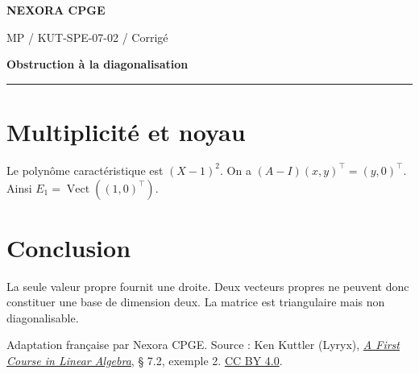 \documentclass[11pt,a4paper]{article}
\begin{document}
{\small\bfseries\color{nexorablue} NEXORA CPGE}\par
{\small MP / KUT-SPE-07-02 / Corrigé}\par
{\LARGE\bfseries Obstruction à la diagonalisation}\par
\vspace{0.25em}\hrule\vspace{0.6em}

\section*{Multiplicité et noyau}
Le polynôme caractéristique est $(X-1)^2$. On a $(A-I)(x,y)^\top=(y,0)^\top$. Ainsi $E_1=\operatorname{Vect}((1,0)^\top)$.

\section*{Conclusion}
La seule valeur propre fournit une droite. Deux vecteurs propres ne peuvent donc constituer une base de dimension deux. La matrice est triangulaire mais non diagonalisable.

\bigskip
{\footnotesize Adaptation française par Nexora CPGE. Source : Ken Kuttler (Lyryx),
\href{https://math.libretexts.org/Bookshelves/Linear_Algebra/A_First_Course_in_Linear_Algebra_(Kuttler)/07\%253A_Spectral_Theory/7.02\%253A_Diagonalization}{\textit{A First Course in Linear Algebra}}, § 7.2, exemple 2.
\href{https://creativecommons.org/licenses/by/4.0/}{CC BY 4.0}.}
\end{document}
